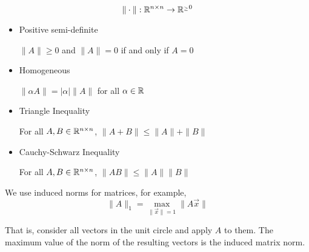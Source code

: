 \begin{remark}
    \[
        \| \cdot \|: \mathbb{R}^{n \times n} \to \mathbb{R}^{_\geq 0}
    \]

    \begin{itemize}
        \item Positive semi-definite

              \( \| A \| \geq 0 \) and \( \| A \| = 0 \) if and only if \( A = 0 \)

        \item Homogeneous

              \( \| \alpha A \| = | \alpha | \| A \| \) for all \( \alpha \in \mathbb{R} \)

        \item Triangle Inequality

              For all \( A, B \in \mathbb{R}^{n \times n} \), \( \| A + B \| \leq \| A \| + \| B \| \)

        \item Cauchy-Schwarz Inequality

              For all \( A, B \in \mathbb{R}^{n \times n} \), \( \| AB \| \leq \| A \| \| B \| \)
    \end{itemize}

    We use induced norms for matrices, for example, \[
        \| A \|_1 = \max_{\| \vec{x} \| = 1} \| A \vec{x} \|
    \]

    That is, consider all vectors in the unit circle and apply \( A \) to them. The maximum value of the norm of the resulting vectors is the induced matrix norm.

    \begin{figure}[H]
        \centering
    \end{figure}


\end{remark}
